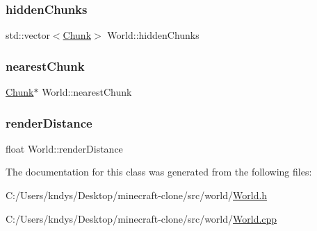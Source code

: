 \mbox{\label{class_world_a582c07bf6901795b509719a2c0f60d29}} 
\subsubsection{\texorpdfstring{hidden\+Chunks}{hiddenChunks}}
{\footnotesize\ttfamily std\+::vector$<$\mbox{\hyperlink{class_chunk}{Chunk}}$>$ World\+::hidden\+Chunks}

\mbox{\label{class_world_abe1868107c690c931c47ee3e8349877a}} 
\subsubsection{\texorpdfstring{nearest\+Chunk}{nearestChunk}}
{\footnotesize\ttfamily \mbox{\hyperlink{class_chunk}{Chunk}}$\ast$ World\+::nearest\+Chunk}

\mbox{\label{class_world_a18992ed73d09b386bed9bb1d3bdfac4f}} 
\subsubsection{\texorpdfstring{render\+Distance}{renderDistance}}
{\footnotesize\ttfamily float World\+::render\+Distance}



The documentation for this class was generated from the following files\+:\begin{DoxyCompactItemize}
\item 
C\+:/\+Users/kndys/\+Desktop/minecraft-\/clone/src/world/\mbox{\hyperlink{_world_8h}{World.\+h}}\item 
C\+:/\+Users/kndys/\+Desktop/minecraft-\/clone/src/world/\mbox{\hyperlink{_world_8cpp}{World.\+cpp}}\end{DoxyCompactItemize}
